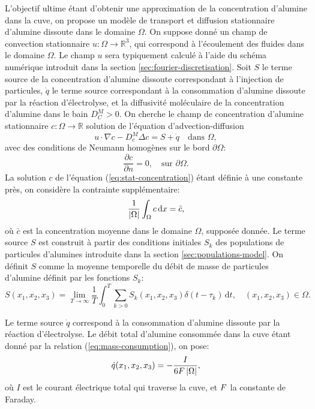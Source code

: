 L'objectif ultime étant d'obtenir une approximation de la
concentration d'alumine dans la cuve, on propose un modèle de
transport et diffusion stationnaire d'alumine dissoute dans le domaine
$\Omega$.  On suppose donné un champ de convection stationnaire
$u:\Omega\to\mathbb R^3$, qui correspond à l'écoulement des fluides
dans le domaine $\Omega$. Le champ $u$ sera typiquement calculé à
l'aide du schéma numérique introduit dans la section
\ref{sec:fourier-discretisation}.  Soit $S$ le terme source de la
concentration d'alumine dissoute correspondant à l'injection de
particules, $\dot q$ le terme source correspondant à la consommation
d'alumine dissoute par la réaction d'électrolyse, et la diffusivité
moléculaire de la concentration d'alumine dans le bain $D_C^M > 0$.
On cherche le champ de concentration d'alumine stationnaire
$c:\Omega\to\mathbb R$ solution de l'équation d'advection-diffusion
\begin{equation}\label{eq:stat-concentration}
  u\cdot \nabla c - D_c^M \Delta c = S + \dot q\quad \text{dans } \Omega,
\end{equation}
avec des conditions de Neumann homogènes sur le bord $\partial
\Omega$:
\begin{equation}
  \frac{\partial c}{\partial n} = 0,\quad\text{sur } \partial \Omega.
\end{equation}
La solution $c$ de l'équation (\ref{eq:stat-concentration}) étant
définie à une constante près, on considère la contrainte
supplémentaire:
\begin{equation}\label{eq:stat-alumina-avg-c}
  \frac{1}{\left\lvert \Omega \right\rvert}\int_\Omega c\,\mathrm dx = \bar c,
\end{equation}
où $\bar c$ est la concentration moyenne dans le domaine $\Omega$,
supposée donnée.
Le terme source $S$ est construit à partir des conditions initiales
$S_k$ des populations de particules d'alumines introduite dans la
section \ref{sec:populations-model}. On définit $S$ comme la moyenne
temporelle du débit de masse de particules d'alumine définit par
les fonctions $S_k$:
\begin{equation}
  S(x_1,x_2,x_3) = \lim_{T\to\infty}\frac{1}{T}\int_0^T \sum_{k>0}
  S_k(x_1, x_2, x_3) \delta(t - \tau_k)\,\mathrm dt, \quad (x_1, x_2, x_3)\in\Omega.
\end{equation}

Le terme source $\dot q$ correspond à la consommation d'alumine
dissoute par la réaction d'électrolyse. Le débit total d'alumine
consommée dans la cuve étant donné par la relation
(\ref{eq:mass-consumption}), on pose:
\begin{equation}\label{eq:stat-alumina-consommation}
  \dot q(x_1, x_2, x_3) = -\frac{I}{6F\left\lvert \Omega \right\rvert},
\end{equation}
où $I$ est le courant électrique total qui traverse la cuve, et
$F$ la constante de Faraday.

